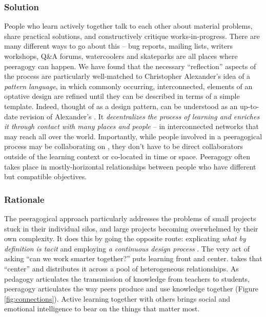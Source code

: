 \subsubsection*{Solution} People who learn actively together talk to each other about material problems, share practical solutions, and constructively critique works-in-progress.  There are many different ways to go about this -- bug reports, mailing lists, writers workshops, Q\&A forums, watercoolers and skateparks are all places where peeragogy can happen.  We have found that the necessary ``reflection'' aspects of the process are particularly well-matched to Christopher Alexander's idea of a \emph{pattern language}, in which commonly occurring,  interconnected, elements of an optative design are refined until they can be described in terms of a simple template.  Indeed, thought of as a design pattern,  can be understood as an up-to-date revision of Alexander's  \cite[p. 99]{alexander1977pattern}.  It \emph{decentralizes the process of learning and enriches it through contact with many places and people} -- in interconnected networks that may reach all over the world.   Importantly, while people involved in a peeragogical process may be collaborating on , they don't have to be direct collaborators outside of the learning context or co-located in time or space.  Peeragogy often takes place in mostly-horizontal relationships between people who have different but compatible objectives. 

\subsubsection*{Rationale}
The peeragogical approach  particularly addresses the problems of small projects stuck in their individual silos, and large projects becoming overwhelmed by their own complexity.  It does this by going the opposite route: explicating \emph{what by definition is tacit} and employing \emph{a continuous design process} \cite[pp. 9--10]{schummer2014beyond}.  The very act of asking ``can we work smarter together?'' puts learning front and center.   takes that ``center'' and distributes it across a pool of heterogeneous relationships.  As pedagogy articulates the transmission of knowledge from teachers to students, peeragogy articulates the way peers produce and use knowledge together (Figure \ref{fig:connections}).  Active learning together with others brings social and emotional intelligence to bear on the things that matter most.


